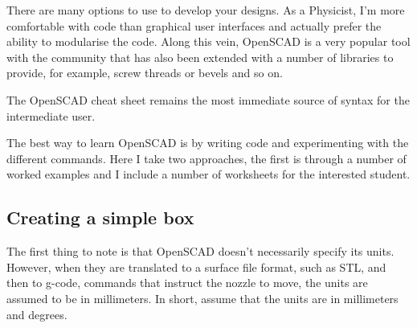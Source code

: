 There are many options to use to develop your designs. As a Physicist, I'm more comfortable with code than graphical user interfaces and actually prefer the ability to modularise the code. Along this vein, OpenSCAD is a very popular tool with the community that has also been extended with a number of libraries to provide, for example, screw threads or bevels and so on. 

The OpenSCAD cheat sheet remains the most immediate source of syntax for the intermediate user. 

The best way to learn OpenSCAD is by writing code and experimenting with the different commands. Here I take two approaches, the first is through a number of worked examples and I include a number of worksheets for the interested student. 

\subsection{Creating a simple box}

The first thing to note is that OpenSCAD doesn't necessarily specify its units. However, when they are translated to a surface file format, such as STL, and then to g-code, commands that instruct the nozzle to move, the units are assumed to be in millimeters. In short, assume that the units are in millimeters and degrees. 

